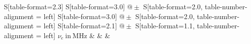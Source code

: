 \begin{table}
    \centering
    \caption{Stromstärken $I_1,I_2$ beim Auftreten des Maximums für verschiedene Anregungsfrequenzen $\nu_e$ mit dem jeweiligen Skalierungsfaktor}
    \label{tab:Werte}
    \begin{tabular}{
	S[table-format=2.3]
	S[table-format=3.0]
	@{${}\pm{}$}
	S[table-format=2.0, table-number-alignment = left]
	S[table-format=3.0]
	@{${}\pm{}$}
	S[table-format=2.0, table-number-alignment = left]
	S[table-format=2.1]
	@{${}\pm{}$}
	S[table-format=1.1, table-number-alignment = left]
	}
	\toprule
	{$\nu_e \ \mathrm{in} \ \si{\mega\hertz}$}		& 		& 
			& 		\\ 
	\midrule
    
    \bottomrule
    \end{tabular}
    \end{table}
